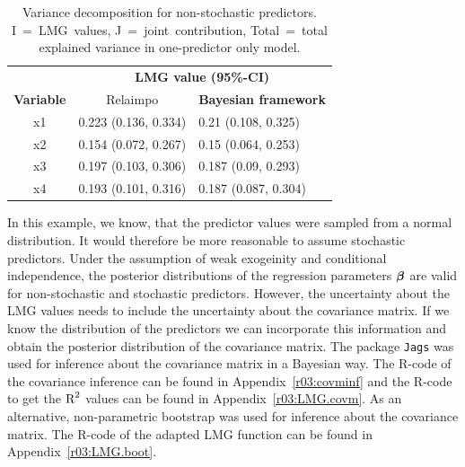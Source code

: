 \documentclass[11pt,a4paper,twoside]{book}
\begin{document}
\begin{table}[h]
\caption{Variance decomposition for non-stochastic predictors. I~=~LMG~values, J~=~joint~contribution, Total~=~total explained variance in one-predictor only model.}
\centering
\begin{tabular}{cll}
   \toprule
   &\multicolumn{2}{c}{\textbf{LMG value (95\%-CI)}} \\
 \textbf{Variable} & \multicolumn{1}{c}{Relaimpo} & \textbf{Bayesian framework}  \\
  \hline
x1 & 0.223 (0.136, 0.334)  & 0.21 (0.108, 0.325)  \\ 
x2 & 0.154 (0.072, 0.267)  & 0.15 (0.064, 0.253)   \\ 
x3 & 0.197 (0.103, 0.306)  & 0.187 (0.09, 0.293)  \\ 
x4 & 0.193 (0.101, 0.316) & 0.187 (0.087, 0.304)  \\ 
   \bottomrule
\end{tabular}
\label{tbl:nonstochEx1relamip}
\end{table}

\FloatBarrier


In this example, we know, that the predictor values were sampled from a normal distribution. It would therefore be more reasonable to assume stochastic predictors. Under the assumption of weak exogeinity and conditional independence, the posterior distributions of the regression parameters ${\boldsymbol{\beta}}$ are valid for non-stochastic and stochastic predictors. However, the uncertainty about the LMG values needs to include the uncertainty about the covariance matrix. If we know the distribution of the predictors we can incorporate this information and obtain the posterior distribution of the covariance matrix. The package \texttt{Jags} was used for inference about the covariance matrix in a Bayesian way. The R-code of the covariance inference can be found in Appendix~\ref{r03:covminf} and the R-code to get the $\text{R}^2$ values can be found in Appendix~\ref{r03:LMG.covm}. As an alternative, non-parametric bootstrap was used for inference about the covariance matrix. The R-code of the adapted LMG function can be found in Appendix~\ref{r03:LMG.boot}.
\end{document}
